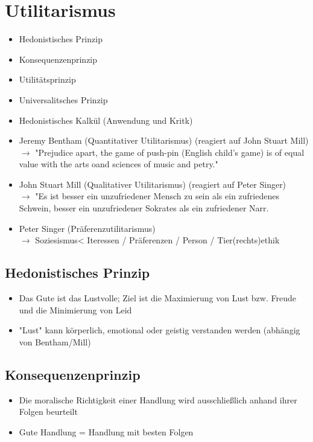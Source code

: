 
\section{Utilitarismus}

\begin{itemize}
    \item Hedonistisches Prinzip
    \item Konsequenzenprinzip
    \item Utilitätsprinzip
    \item Universalitsches Prinzip
    \item Hedonistisches Kalkül (Anwendung und Kritk)
\end{itemize}

\begin{itemize}
    \item Jeremy Bentham (Quantitativer Utilitarismus) (reagiert auf John Stuart Mill) \\
        $\rightarrow$ "Prejudice apart, the game of push-pin (English child's game) is of equal value with the arts oand sciences of music and petry."
    \item John Stuart Mill (Qualitativer Utilitarismus) (reagiert auf Peter Singer) \\
        $\rightarrow$ "Es ist besser ein unzufriedener Mensch zu sein als ein zufriedenes Schwein, besser ein unzufriedener Sokrates als ein zufriedener Narr.
    \item Peter Singer (Präferenzutilitarismus) \\
        $\rightarrow$ Soziesismus< Iteressen / Präferenzen / Person / Tier(rechts)ethik
\end{itemize}

\subsection{Hedonistisches Prinzip}
\begin{itemize}
    \item Das Gute ist das Lustvolle; Ziel ist die Maximierung von Lust bzw. Freude und die Minimierung von Leid
    \item "Lust" kann körperlich, emotional oder geistig verstanden werden (abhängig von Bentham/Mill)
\end{itemize}

\subsection{Konsequenzenprinzip}
\begin{itemize}
    \item Die moralische Richtigkeit einer Handlung wird ausschließlich anhand ihrer Folgen beurteilt
    \item Gute Handlung = Handlung mit besten Folgen
\end{itemize}

